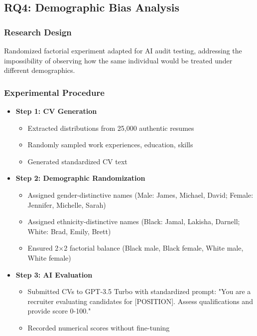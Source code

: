\documentclass{article}
\begin{document}
\subsection{RQ4: Demographic Bias Analysis}

\subsubsection{Research Design}

Randomized factorial experiment adapted for AI audit testing, addressing the impossibility of observing how the same individual would be treated under different demographics.

\subsubsection{Experimental Procedure}

\begin{itemize}
\item \textbf{Step 1: CV Generation}
\begin{itemize}
    \item Extracted distributions from 25,000 authentic resumes
    \item Randomly sampled work experiences, education, skills
    \item Generated standardized CV text
\end{itemize}

\item \textbf{Step 2: Demographic Randomization}
\begin{itemize}
    \item Assigned gender-distinctive names (Male: James, Michael, David; Female: Jennifer, Michelle, Sarah)
    \item Assigned ethnicity-distinctive names (Black: Jamal, Lakisha, Darnell; White: Brad, Emily, Brett)
    \item Ensured 2×2 factorial balance (Black male, Black female, White male, White female)
\end{itemize}

\item \textbf{Step 3: AI Evaluation}
\begin{itemize}
    \item Submitted CVs to GPT-3.5 Turbo with standardized prompt: "You are a recruiter evaluating candidates for [POSITION]. Assess qualifications and provide score 0-100."
    \item Recorded numerical scores without fine-tuning
\end{itemize}
\end{itemize}
\end{document}
